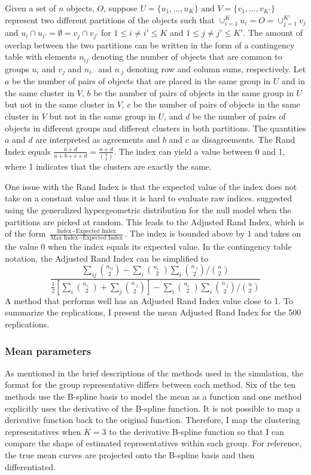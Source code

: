 Given a set of $n$ objects, $O$, suppose $U = \{u_{1},...,u_{K}\}$ and $V=\{v_{1},...,v_{K'}\}$ represent two different partitions of the objects such that $\cup^{K}_{i=1}u_{i} = O = \cup^{K'}_{j=1}v_{j}$ and $u_{i}\cap u_{i'} = \emptyset = v_{j}\cap v_{j'}$ for $1\leq i\not=i'\leq K$ and $1\leq j\not= j'\leq K'$. The amount of overlap between the two partitions can be written in the form of a contingency table with elements $n_{ij}$ denoting the number of objects that are common to groups $u_{i}$ and $v_{j}$ and $n_{i\cdot}$ and $n_{\cdot j}$ denoting row and column sums, respectively. Let $a$ be the number of pairs of objects that are placed in the same group in $U$ and in the same cluster in $V$, $b$ be the number of pairs of objects in the same group in $U$ but not in the same cluster in $V$, $c$ be the number of pairs of objects in the same cluster in $V$ but not in the same group in $U$, and $d$ be the number of pairs of objects in different groups and different clusters in both partitions. The quantities $a$ and $d$ are interpreted as agreements and $b$ and $c$ as disagreements. The Rand Index \cite{rand1971} equals $\frac{a+d}{a+b+c+d}=\frac{a+d}{{n \choose 2}}$.  The index can yield a value between 0 and 1, where 1 indicates that the clusters are exactly the same.

One issue with the Rand Index is that the expected value of the index does not take on a constant value and thus it is hard to evaluate raw indices. \Textcite{hubert1985} suggested using the generalized hypergeometric distribution for the null model when the partitions are picked at random. This leads to the Adjusted Rand Index, which is of the form $\frac{\text{Index} - \text{Expected Index}}{\text{Max Index}-\text{Expected Index}}$. The index is bounded above by 1 and takes on the value 0 when the index equals its expected value. In the contingency table notation, the Adjusted Rand Index can be simplified to
$$\frac{\sum_{ij}{n_{ij} \choose 2} - \sum_{i} {n_{i\cdot} \choose 2} \sum_{i} {n_{\cdot j} \choose 2} / {n \choose 2}}{\frac{1}{2}\left[\sum_{i}{n_{i\cdot} \choose 2}+\sum_{j}{n_{\cdot j} \choose 2}\right] - \sum_{i} {n_{i\cdot} \choose 2} \sum_{i} {n_{\cdot j} \choose 2} / {n \choose 2}}$$
A method that performs well has an Adjusted Rand Index value close to 1. To summarize the replications, I present the mean Adjusted Rand Index for the 500 replications.

\subsubsection{Mean parameters}
As mentioned in the brief descriptions of the methods used in the simulation, the format for the group representative differs between each method. Six of the ten methods use the B-spline basis to model the mean as a function and one method explicitly uses the derivative of the B-spline function. It is not possible to map a derivative function back to the original function. Therefore, I map the clustering representatives when $K=3$ to the derivative B-spline function so that I can compare the shape of estimated representatives within each group. For reference, the true mean curves are projected onto the B-spline basis and then differentiated. 

